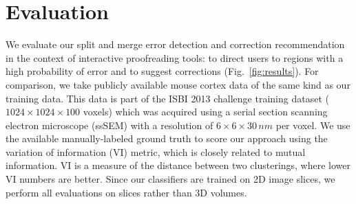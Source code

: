 \section{Evaluation}
\label{sec:evaluation}
We evaluate our split and merge error detection and correction recommendation in the context of interactive proofreading tools: to direct users to regions with a high probability of error and to suggest corrections (Fig.~\ref{fig:results}). For comparison, we take publicly available mouse cortex data of the same kind as our training data. This data is part of the ISBI 2013 challenge training dataset ($1024\times1024\times100$ voxels) which was acquired using a serial section scanning electron microscope (ssSEM) with a resolution of $6\times6\times30\, nm$ per voxel. We use the available manually-labeled ground truth to score our approach using the variation of information (VI) metric, which is closely related to mutual information. VI is a measure of the distance between two clusterings, where lower VI numbers are better. Since our classifiers are trained on 2D image slices, we perform all evaluations on slices rather than 3D volumes.


